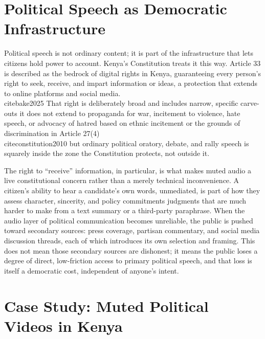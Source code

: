 \documentclass{article}
\begin{document}
\section{Political Speech as Democratic Infrastructure}
\par 
Political speech is not ordinary content; it is part of the infrastructure that lets citizens hold power to account. Kenya’s Constitution treats it this way. Article 33 is described as the bedrock of digital rights in Kenya, guaranteeing every person’s right to seek, receive, and impart information or ideas, a protection that extends to online platforms and social media. \\cite{bake2025} That right is deliberately broad and includes narrow, specific carve-outs it does not extend to propaganda for war, incitement to violence, hate speech, or advocacy of hatred based on ethnic incitement or the grounds of discrimination in Article 27(4) \\cite{constitution2010}  but ordinary political oratory, debate, and rally speech is squarely inside the zone the Constitution protects, not outside it.
\par 
The right to “receive” information, in particular, is what makes muted audio a live constitutional concern rather than a merely technical inconvenience. A citizen’s ability to hear a candidate’s own words, unmediated, is part of how they assess character, sincerity, and policy commitments judgments that are much harder to make from a text summary or a third-party paraphrase. When the audio layer of political communication becomes unreliable, the public is pushed toward secondary sources: press coverage, partisan commentary, and social media discussion threads, each of which introduces its own selection and framing. This does not mean those secondary sources are dishonest; it means the public loses a degree of direct, low-friction access to primary political speech, and that loss is itself a democratic cost, independent of anyone’s intent.

\section{Case Study: Muted Political Videos in Kenya}
\end{document}
